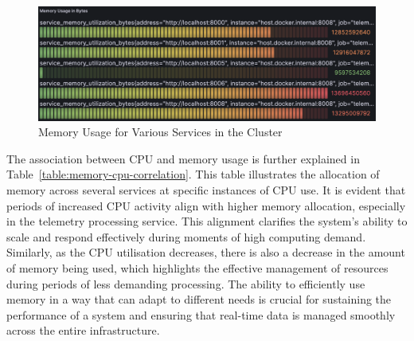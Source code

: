 \documentclass[journal]{IEEEtran}
\begin{document}
\begin{figure}
  \centering
  \includegraphics[width=\columnwidth]{images/Memory-usage-for-various-services-in-kube.png}
  \caption{Memory Usage for Various Services in the Cluster}
  \label{kubernetesClusterMemoryUsage}
\end{figure}

The association between CPU and memory usage is further explained in Table~\ref{table:memory-cpu-correlation}. This table illustrates the allocation of memory across several services at specific instances of CPU use. It is evident that periods of increased CPU activity align with higher memory allocation, especially in the telemetry processing service. This alignment clarifies the system's ability to scale and respond effectively during moments of high computing demand. Similarly, as the CPU utilisation decreases, there is also a decrease in the amount of memory being used, which highlights the effective management of resources during periods of less demanding processing. The ability to efficiently use memory in a way that can adapt to different needs is crucial for sustaining the performance of a system and ensuring that real-time data is managed smoothly across the entire infrastructure.
\end{document}
